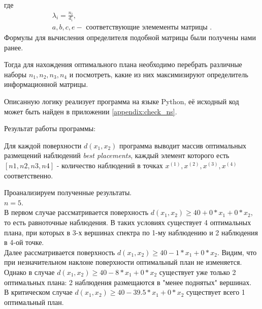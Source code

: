 где
\begin{gather*}
\lambda_i = \frac {n_i} {d_i}, \\
a, b, c, e - \text{ соответствующие элемементы матрицы }.
\end{gather*}
Формулы для вычисления определителя подобной матрицы были получены нами ранее.

Тогда для нахождения оптимального плана необходимо перебрать различные наборы $n_1, n_2, n_3, n_4$ и посмотреть, какие из них максимизируют определитель информационной матрицы.  

Описанную логику реализует программа на языке Python, её исходный код может быть найден в приложении \ref{appendix:check_ns}.

Результат работы программы:



Для каждой поверхности $d(x_1, x_2)$ программа выводит массив оптимальных размещений наблюдений \textit{best placements}, каждый элемент которого есть $[n1, n2, n3, n4]$ -  количество наблюдений в точках $x^{(1)}, x^{(2)}, x^{(3)}, x^{(4)}$ соответственно.

Проанализируем полученные результаты.\\
$n = 5$.\\
В первом случае рассматривается поверхность $d(x_1, x_2) \ge 40 + 0*x_1 + 0*x_2$, то есть равноточные наблюдения. В таких условиях существует 4 оптимальных плана, при которых в 3-х вершинах спектра по 1-му наблюдению и 2 наблюдения в 4-ой точке. \\
Далее рассматривается поверхность $d(x_1, x_2) \ge 40 - 1*x_1 + 0*x_2$. Видим, что при незначительном наклоне поверхности оптимальный план не изменяется. \\
Однако в случае $d(x_1, x_2) \ge 40 - 8*x_1 + 0*x_2$ существует уже только 2 оптимальных плана: 2 наблюдения размещаются в "менее поднятых" вершинах.\\
В критическом случае $d(x_1, x_2) \ge 40 - 39.5*x_1 + 0*x_2$ существует всего 1 оптимальный план.